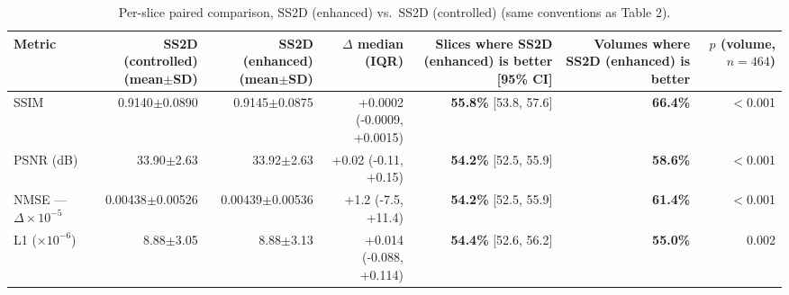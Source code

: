 \begin{table}[ht]
\centering
\caption{Per-slice paired comparison, SS2D (enhanced) vs.\ SS2D (controlled) (same conventions as Table 2).}
\label{tab:paired-v9}
\begin{tabular}{lrrrrrr}
\toprule
Metric & SS2D (controlled) (mean$\pm$SD) & SS2D (enhanced) (mean$\pm$SD) & $\Delta$ median (IQR) & Slices where SS2D (enhanced) is better [95\% CI] & Volumes where SS2D (enhanced) is better & $p$ (volume, $n{=}464$) \\
\midrule
SSIM & 0.9140$\pm$0.0890 & 0.9145$\pm$0.0875 & +0.0002 (-0.0009, +0.0015) & \textbf{55.8\%} [53.8, 57.6] & \textbf{66.4\%} & $<$0.001 \\
PSNR (dB) & 33.90$\pm$2.63 & 33.92$\pm$2.63 & +0.02 (-0.11, +0.15) & \textbf{54.2\%} [52.5, 55.9] & \textbf{58.6\%} & $<$0.001 \\
NMSE --- $\Delta\times 10^{-5}$ & 0.00438$\pm$0.00526 & 0.00439$\pm$0.00536 & +1.2 (-7.5, +11.4) & \textbf{54.2\%} [52.5, 55.9] & \textbf{61.4\%} & $<$0.001 \\
L1 ($\times 10^{-6}$) & 8.88$\pm$3.05 & 8.88$\pm$3.13 & +0.014 (-0.088, +0.114) & \textbf{54.4\%} [52.6, 56.2] & \textbf{55.0\%} & 0.002 \\
\bottomrule
\end{tabular}
\end{table}
